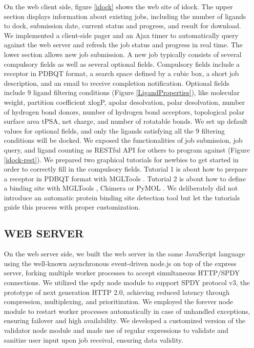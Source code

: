 \documentclass[12pt]{article}
\begin{document}
On the web client side, figure \ref{idock} shows the web site of idock. The upper section displays information about existing jobs, including the number of ligands to dock, submission date, current status and progress, and result for download. We implemented a client-side pager and an Ajax timer to automatically query against the web server and refresh the job status and progress in real time. The lower section allows new job submission. A new job typically consists of several compulsory fields as well as several optional fields. Compulsory fields include a receptor in PDBQT format, a search space defined by a cubic box, a short job description, and an email to receive completion notification. Optional fields include 9 ligand filtering conditions (Figure \ref{LigandProperties}), like molecular weight, partition coefficient xlogP, apolar desolvation, polar desolvation, number of hydrogen bond donors, number of hydrogen bond acceptors, topological polar surface area tPSA, net charge, and number of rotatable bonds. We set up default values for optional fields, and only the ligands satisfying all the 9 filtering conditions will be docked. We exposed the functionalities of job submission, job query, and ligand counting as RESTful API for others to program against (Figure \ref{idock-rest}). We prepared two graphical tutorials for newbies to get started in order to correctly fill in the compulsory fields. Tutorial 1 is about how to prepare a receptor in PDBQT format with MGLTools \citep{596}. Tutorial 2 is about how to define a binding site with MGLTools \citep{596}, Chimera \citep{1219} or PyMOL \citep{1221}. We deliberately did not introduce an automatic protein binding site detection tool but let the tutorials guide this process with proper customization.

\subsection*{\sffamily \large WEB SERVER}

On the web server side, we built the web server in the same JavaScript language using the well-known asynchronous event-driven node.js on top of the express server, forking multiple worker processes to accept simultaneous HTTP/SPDY connections. We utilized the spdy node module to support SPDY protocol v3, the prototype of next generation HTTP 2.0, achieving reduced latency through compression, multiplexing, and prioritization. We employed the forever node module to restart worker processes automatically in case of unhandled exceptions, ensuring failover and high availability. We developed a customized version of the validator node module and made use of regular expressions to validate and sanitize user input upon job receival, ensuring data validity.
\end{document}

